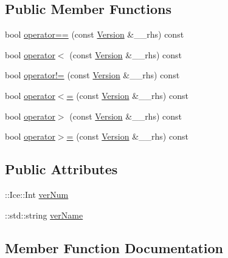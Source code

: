 \subsection*{Public Member Functions}
\begin{DoxyCompactItemize}
\item 
bool \hyperlink{struct_file_system_1_1_version_a32832303faeaffbda3e7872743a852e6}{operator==} (const \hyperlink{struct_file_system_1_1_version}{Version} \&\+\_\+\+\_\+rhs) const 
\item 
bool \hyperlink{struct_file_system_1_1_version_a9a44e56a52173f7ab4d37d4a82d72aa1}{operator$<$} (const \hyperlink{struct_file_system_1_1_version}{Version} \&\+\_\+\+\_\+rhs) const 
\item 
bool \hyperlink{struct_file_system_1_1_version_a736ea241f3c14654d6c8f4483516f2c9}{operator!=} (const \hyperlink{struct_file_system_1_1_version}{Version} \&\+\_\+\+\_\+rhs) const 
\item 
bool \hyperlink{struct_file_system_1_1_version_a09a411f27ec8c250387ad898b7d37857}{operator$<$=} (const \hyperlink{struct_file_system_1_1_version}{Version} \&\+\_\+\+\_\+rhs) const 
\item 
bool \hyperlink{struct_file_system_1_1_version_a364094d081cad8f20e76a32b7b82ebcb}{operator$>$} (const \hyperlink{struct_file_system_1_1_version}{Version} \&\+\_\+\+\_\+rhs) const 
\item 
bool \hyperlink{struct_file_system_1_1_version_a6296852fc8eac255bcc23c4f586cb6b1}{operator$>$=} (const \hyperlink{struct_file_system_1_1_version}{Version} \&\+\_\+\+\_\+rhs) const 
\end{DoxyCompactItemize}
\subsection*{Public Attributes}
\begin{DoxyCompactItemize}
\item 
\+::Ice\+::\+Int \hyperlink{struct_file_system_1_1_version_afdc710dd81f2d721b432b3baa58ec58a}{ver\+Num}
\item 
\+::std\+::string \hyperlink{struct_file_system_1_1_version_ae304c0f218e096f2d6edf7aef9f29068}{ver\+Name}
\end{DoxyCompactItemize}


\subsection{Member Function Documentation}
\hypertarget{struct_file_system_1_1_version_a736ea241f3c14654d6c8f4483516f2c9}{}

